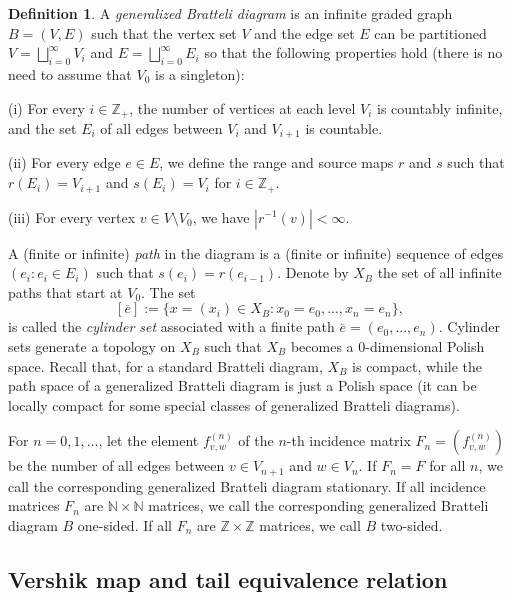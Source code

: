 \documentclass[11pt, twoside]{amsart}
\theoremstyle{definition}
\newtheorem{definition}{Definition}[section]
\theoremstyle{remark}
\theoremstyle{plain}
\def\ol{\overline}
\numberwithin{equation}{section}
\begin{document}
\begin{definition}\label{Def:generalized_BD} A 
\textit{generalized Bratteli diagram} is an infinite graded graph 
$B = (V, E)$ such that the 
vertex set $V$ and the edge set $E$ can be partitioned $V = \bigsqcup_{i=0}^\infty  V_i$ and $E = 
\bigsqcup_{i=0}^\infty  E_i$ so that the following properties hold (there is no need to assume that $V_0$ is a singleton): 

(i) For every $i \in \mathbb{Z}_+$, the number of vertices at each level 
$V_i$ is countably infinite, and the set $E_i$
of all edges between $V_i$ and $V_{i+1}$ is countable.

(ii) For every edge $e\in E$, we define the 
range and 
source maps $r$ and $s$ such that $r(E_i) = V_{i+1}$ and 
$s(E_i) = V_{i}$ for $i \in \mathbb{Z}_+$.  


(iii) For every vertex $v \in V \setminus V_0$, we 
have $|r^{-1}(v)| < \infty$.  
\end{definition} 

A (finite or infinite) \textit{path} in the diagram is a (finite or infinite) sequence of edges $(e_i: e_i\in E_i)$ such that $s(e_i)=r(e_{i-1})$. Denote by $X_B$ the set of all infinite paths that start at $V_0$. The set 
$$
    [\ol e] := \{x = (x_i) \in X_B : x_0 = e_0, ..., x_n = e_n\}, 
$$ 
is called the \textit{cylinder set} associated with a finite path $\ol e = (e_0, ... , e_n)$. Cylinder sets generate a topology on $X_B$ such that
$X_B$ becomes a 0-dimensional Polish space. Recall that, for a standard Bratteli diagram, $X_B$ is compact, while the path space of a generalized Bratteli diagram is just a Polish space (it can be locally compact for 
some special classes of generalized Bratteli diagrams).


For $n = 0,1,\ldots$, let the element $f^{(n)}_{v,w}$ of the $n$-th incidence matrix $F_n = (f^{(n)}_{v,w})$ be the number of all edges between $v \in V_{n+1}$ and $w \in V_n$. If $F_n = F$ for all $n$, we call the corresponding generalized Bratteli diagram stationary. If all incidence matrices $F_n$ are $\mathbb{N}\times \mathbb{N}$ matrices, we call the corresponding generalized Bratteli diagram $B$ one-sided. If all $F_n$ are $\mathbb{Z}\times \mathbb{Z}$ matrices, we call $B$ two-sided.

\subsection{Vershik map and tail equivalence relation}
\end{document}
